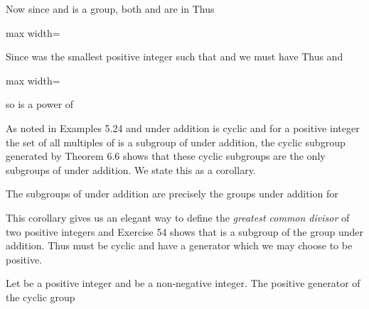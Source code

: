 \documentclass[11pt,oneside]{article}
\begin{document}
\begin{BookBody}
\noindent Now since  and  is a group, both  and  are in  Thus

\begin{center}\begin{adjustbox}{max width=\linewidth}\end{adjustbox}\end{center}

\noindent Since  was the smallest positive integer such that  and  we must have  Thus  and

\begin{center}\begin{adjustbox}{max width=\linewidth}\end{adjustbox}\end{center}

\noindent so  is a power of  \BookEnd{\blacklozenge}

As noted in Examples 5.24 and  under addition is cyclic and for a positive integer  the set  of all multiples of  is a subgroup of  under addition, the cyclic subgroup generated by  Theorem 6.6 shows that these cyclic subgroups are the only subgroups of  under addition. We state this as a corollary.

 The subgroups of  under addition are precisely the groups  under addition for  \BookEnd{\blacklozenge}

This corollary gives us an elegant way to define the\textit{ greatest common divisor} of two positive integers  and  Exercise 54 shows that  is a subgroup of the group  under addition. Thus  must be cyclic and have a generator  which we may choose to be positive.

 Let  be a positive integer and  be a non-negative integer. The positive generator  of the cyclic group


\end{BookBody}
\end{document}
